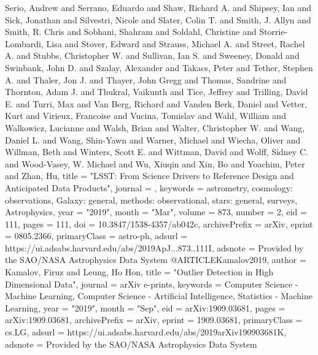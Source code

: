 {{         {Serio}, Andrew and {Serrano}, Eduardo and {Shaw}, Richard A. and
         {Shipsey}, Ian and {Sick}, Jonathan and {Silvestri}, Nicole and
         {Slater}, Colin T. and {Smith}, J. Allyn and {Smith}, R. Chris and
         {Sobhani}, Shahram and {Soldahl}, Christine and
         {Storrie-Lombardi}, Lisa and {Stover}, Edward and
         {Strauss}, Michael A. and {Street}, Rachel A. and
         {Stubbs}, Christopher W. and {Sullivan}, Ian S. and {Sweeney}, Donald and
         {Swinbank}, John D. and {Szalay}, Alexander and {Takacs}, Peter and
         {Tether}, Stephen A. and {Thaler}, Jon J. and {Thayer}, John Gregg and
         {Thomas}, Sandrine and {Thornton}, Adam J. and {Thukral}, Vaikunth and
         {Tice}, Jeffrey and {Trilling}, David E. and {Turri}, Max and
         {Van Berg}, Richard and {Vanden Berk}, Daniel and {Vetter}, Kurt and
         {Virieux}, Francoise and {Vucina}, Tomislav and {Wahl}, William and
         {Walkowicz}, Lucianne and {Walsh}, Brian and {Walter}, Christopher W. and
         {Wang}, Daniel L. and {Wang}, Shin-Yawn and {Warner}, Michael and
         {Wiecha}, Oliver and {Willman}, Beth and {Winters}, Scott E. and
         {Wittman}, David and {Wolff}, Sidney C. and {Wood-Vasey}, W. Michael and
         {Wu}, Xiuqin and {Xin}, Bo and {Yoachim}, Peter and {Zhan}, Hu},
        title = "{LSST: From Science Drivers to Reference Design and Anticipated Data Products}",
      journal = {\apj},
     keywords = {astrometry, cosmology: observations, Galaxy: general, methods: observational, stars: general, surveys, Astrophysics},
         year = "2019",
        month = "Mar",
       volume = {873},
       number = {2},
          eid = {111},
        pages = {111},
          doi = {10.3847/1538-4357/ab042c},
archivePrefix = {arXiv},
       eprint = {0805.2366},
 primaryClass = {astro-ph},
       adsurl = {https://ui.adsabs.harvard.edu/abs/2019ApJ...873..111I},
      adsnote = {Provided by the SAO/NASA Astrophysics Data System}
}
@ARTICLE{Kamalov2019,
       author = {{Kamalov}, Firuz and {Leung}, Ho Hon},
        title = "{Outlier Detection in High Dimensional Data}",
      journal = {arXiv e-prints},
     keywords = {Computer Science - Machine Learning, Computer Science - Artificial Intelligence, Statistics - Machine Learning},
         year = "2019",
        month = "Sep",
          eid = {arXiv:1909.03681},
        pages = {arXiv:1909.03681},
archivePrefix = {arXiv},
       eprint = {1909.03681},
 primaryClass = {cs.LG},
       adsurl = {https://ui.adsabs.harvard.edu/abs/2019arXiv190903681K},
      adsnote = {Provided by the SAO/NASA Astrophysics Data System}
}
